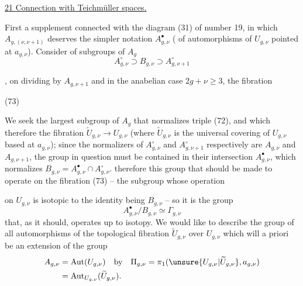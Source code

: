 
\uline{21 Connection with Teichmüller spaces.}

First a supplement connected with the diagram  (31) of number 19, in which \(A_{g,(\nu,\nu+1)}\) deserves the simpler notation \(A_{g,\nu}^{\bullet}\) ( of automorphisms of \(U_{g,\nu}\) pointed at \(a_{g,\nu}\)). Consider  of subgroups of \(A_g\)
\[
 A_{g,\nu}^{\circ}\supset B_{g,\nu}\supset A_{g,\nu+1}^{\circ}
 \tag{72}
\]

, on dividing by \(A_{g,\nu+1}\) and in the anabelian case \(2g+\nu\geq 3\), the fibration

(73) 

We seek the largest subgroup of \(A_g\) that normalizes  triple (72), and which   therefore  the fibration \(\widetilde U_{g,\nu}\to U_{g,\nu}\) (where \(\widetilde U_{g,\nu}\) is the universal covering of \(U_{g,\nu}\) based at \(a_{g,\nu}\)); since the normalizers of \(A_{g,\nu}^{\circ}\) and \(A_{g,\nu+1}^{\circ}\) respectively are \(A_{g,\nu}\) and \(A_{g,\nu+1}\), the group in question must be contained in their intersection \(A_{g,\nu}^{\bullet}\), which normalizes  \(B_{g,\nu}=A_{g,\nu}^{\bullet}\cap A_{g,\nu}^{\circ}\).  therefore this group that should be made to operate on the fibration (73) -- the subgroup    whose operation


on \(U_{g,\nu}\) is isotopic to the identity being  \(B_{g,\nu}\) -- so it is the group \unsure{\(\Gamma\)}
\[
 A_{g,\nu}^{\bullet}/B_{g,\nu}\simeq\Gamma_{g,\nu}
\]
that, as it should, operates up to isotopy. We would like to describe the group of all automorphisms of the topological fibration \(\widetilde U_{g,\nu}\) over \(U_{g,\nu}\) which will a priori be an extension of the group
\[
 \begin{aligned}
 A_{g,\nu}&=\operatorname{Aut}(U_{g,\nu})\quad\text{by}\quad
 \Pi_{g,\nu}=\pi_1(\unsure{U_{g,\nu}|\widetilde U_{g,\nu}},a_{g,\nu})\\
 &=\operatorname{Aut}_{U_{g,\nu}}(\widetilde U_{g,\nu}).
 \end{aligned}
\]

